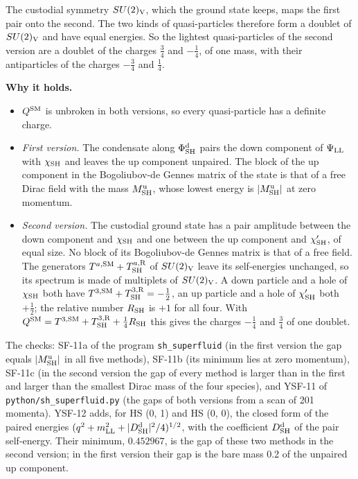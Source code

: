 \documentclass[
  10pt,
]{article}
\providecommand{\tightlist}{%
  \setlength{\itemsep}{0pt}\setlength{\parskip}{0pt}}
\begin{document}
The custodial symmetry \(SU(2)_{\rm V}\), which the ground state keeps,
maps the first pair onto the second. The two kinds of quasi-particles
therefore form a doublet of \(SU(2)_{\rm V}\) and have equal energies.
So the lightest quasi-particles of the second version are a doublet of
the charges \(\tfrac34\) and \(-\tfrac14\), of one mass, with their
antiparticles of the charges \(-\tfrac34\) and \(\tfrac14\).

\textbf{Why it holds.}

\begin{itemize}
\tightlist
\item
  \(Q^{\rm SM}\) is unbroken in both versions, so every quasi-particle
  has a definite charge.
\item
  \emph{First version.} The condensate along \(\Phi^{\rm d}_{\rm SH}\)
  pairs the down component of \(\Psi_{\rm LL}\) with \(\chi_{\rm SH}\)
  and leaves the up component unpaired. The block of the up component in
  the Bogoliubov-de Gennes matrix of the state is that of a free Dirac
  field with the mass \(M^{\rm u}_{\rm SH}\), whose lowest energy is
  \(\lvert M^{\rm u}_{\rm SH}\rvert\) at zero momentum.
\item
  \emph{Second version.} The custodial ground state has a pair amplitude
  between the down component and \(\chi_{\rm SH}\) and one between the
  up component and \(\chi'_{\rm SH}\), of equal size. No block of its
  Bogoliubov-de Gennes matrix is that of a free field. The generators
  \(T^{a,{\rm SM}}+T^{a,{\rm R}}_{\rm SH}\) of \(SU(2)_{\rm V}\) leave
  its self-energies unchanged, so its spectrum is made of multiplets of
  \(SU(2)_{\rm V}\). A down particle and a hole of \(\chi_{\rm SH}\)
  both have \(T^{3,{\rm SM}}+T^{3,{\rm R}}_{\rm SH}=-\tfrac12\), an up
  particle and a hole of \(\chi'_{\rm SH}\) both \(+\tfrac12\); the
  relative number \(R_{\rm SH}\) is \(+1\) for all four. With
  \(Q^{\rm SM}=T^{3,{\rm SM}}+T^{3,{\rm R}}_{\rm SH}+\tfrac14R_{\rm SH}\)
  this gives the charges \(-\tfrac14\) and \(\tfrac34\) of one doublet.
\end{itemize}

The checks: SF-11a of the program \texttt{sh\_superfluid} (in the first
version the gap equals \(\lvert M^{\rm u}_{\rm SH}\rvert\) in all five
methods), SF-11b (its minimum lies at zero momentum), SF-11c (in the
second version the gap of every method is larger than in the first and
larger than the smallest Dirac mass of the four species), and YSF-11 of
\texttt{python/sh\_superfluid.py} (the gaps of both versions from a scan
of 201 momenta). YSF-12 adds, for HS (0, 1) and HS (0, 0), the closed
form of the paired energies
\((q^2+m_{\rm LL}^2+\lvert D^{\rm d}_{\rm SH}\rvert^2/4)^{1/2}\), with
the coefficient \(D^{\rm d}_{\rm SH}\) of the pair self-energy. Their
minimum, \(0.452967\), is the gap of these two methods in the second
version; in the first version their gap is the bare mass 0.2 of the
unpaired up component.
\end{document}
